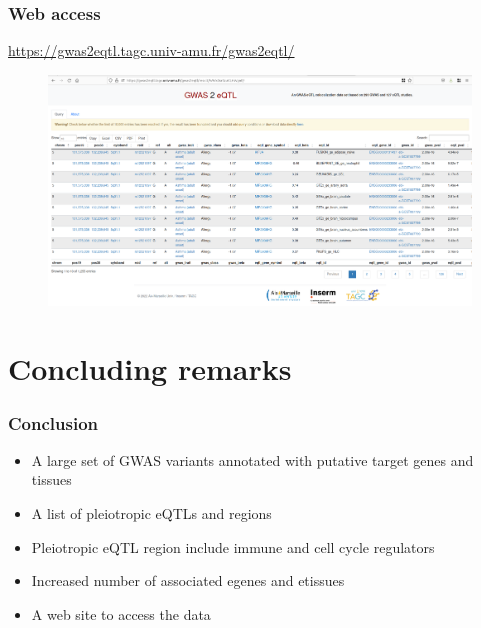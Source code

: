 \documentclass{beamer}
\begin{document}
    \begin{frame}
        \frametitle{Web access}

        \url{https://gwas2eqtl.tagc.univ-amu.fr/gwas2eqtl/}


        \begin{figure}[!]
            \includegraphics[width=\textwidth]{fig/web_portal.png}\label{fig:coloc_web}
        \end{figure}

    \end{frame}

    \section{Concluding remarks} %

    \begin{frame}
        \frametitle{Conclusion}

        \begin{itemize}
            \item A large set of GWAS variants annotated with putative target genes and tissues
            \item A list of pleiotropic eQTLs and regions
            \item Pleiotropic eQTL region include immune and cell cycle regulators
            \item Increased number of associated egenes and etissues
            \item A web site to access the data
        \end{itemize}

    \end{frame}
\end{document}
